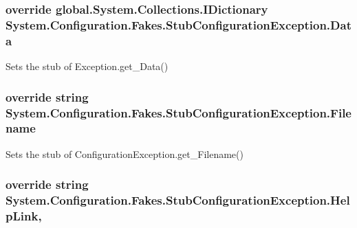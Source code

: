 \hypertarget{class_system_1_1_configuration_1_1_fakes_1_1_stub_configuration_exception_a308582fa42a5a189eb4aded4fc2f89a4}{
\subsubsection[{Data}]{\setlength{\rightskip}{0pt plus 5cm}override global.\-System.\-Collections.\-I\-Dictionary System.\-Configuration.\-Fakes.\-Stub\-Configuration\-Exception.\-Data\hspace{0.3cm}{\ttfamily [get]}}}\label{class_system_1_1_configuration_1_1_fakes_1_1_stub_configuration_exception_a308582fa42a5a189eb4aded4fc2f89a4}


Sets the stub of Exception.\-get\-\_\-\-Data()

\hypertarget{class_system_1_1_configuration_1_1_fakes_1_1_stub_configuration_exception_aed1315a0740299707a1e08723e08822a}{
\subsubsection[{Filename}]{\setlength{\rightskip}{0pt plus 5cm}override string System.\-Configuration.\-Fakes.\-Stub\-Configuration\-Exception.\-Filename\hspace{0.3cm}{\ttfamily [get]}}}\label{class_system_1_1_configuration_1_1_fakes_1_1_stub_configuration_exception_aed1315a0740299707a1e08723e08822a}


Sets the stub of Configuration\-Exception.\-get\-\_\-\-Filename()

\hypertarget{class_system_1_1_configuration_1_1_fakes_1_1_stub_configuration_exception_aeef6d4e4ab6a425adaf6e3ca99a6f416}{
\subsubsection[{Help\-Link}]{\setlength{\rightskip}{0pt plus 5cm}override string System.\-Configuration.\-Fakes.\-Stub\-Configuration\-Exception.\-Help\-Link\hspace{0.3cm}{\ttfamily [get]}, {\ttfamily [set]}}}\label{class_system_1_1_configuration_1_1_fakes_1_1_stub_configuration_exception_aeef6d4e4ab6a425adaf6e3ca99a6f416}


